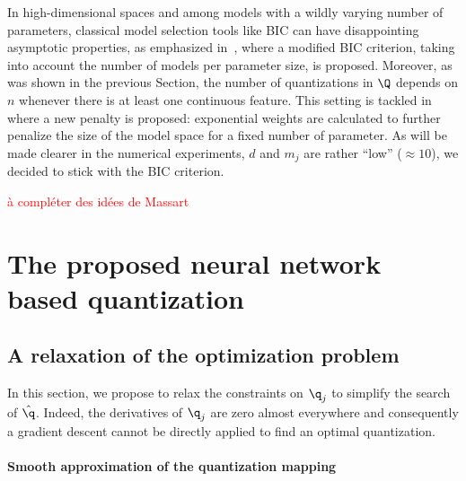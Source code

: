 In high-dimensional spaces and among models with a wildly varying number of parameters, classical model selection tools like BIC can have disappointing asymptotic properties, as emphasized in~\cite{chen2008extended}, where a modified BIC criterion, taking into account the number of models per parameter size, is proposed. Moreover, as was shown in the previous Section, the number of quantizations in $\Q$ depends on $n$ whenever there is at least one continuous feature. This setting is tackled in~\cite{} where a new penalty is proposed: exponential weights are calculated to further penalize the size of the model space for a fixed number of parameter. As will be made clearer in the numerical experiments, $d$ and $m_j$ are rather ``low'' ($\approx 10$), we decided to stick with the BIC criterion.


\textcolor{red}{à compléter des idées de Massart}

\section{The proposed neural network based quantization}
\label{sec:proposal}

\subsection{A relaxation of the optimization problem} \label{subsec:relaxation}

In this section, we propose to relax the constraints on $\q_j$ to simplify the search of $\hat{\q}$. Indeed, the derivatives of $\q_j$ are zero almost everywhere and consequently a gradient descent cannot be directly applied to find an optimal quantization.

\paragraph{Smooth approximation of the quantization mapping}


